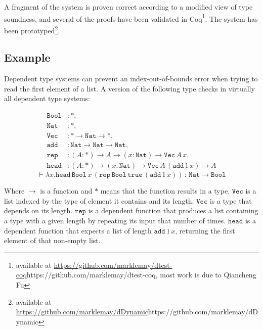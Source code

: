 A fragment of the system is proven correct according to a modified view of type soundness, and several of the proofs have been validated in Coq\footnote{
available at \url{https://github.com/marklemay/dtest-coq}{https://github.com/marklemay/dtest-coq}, most work is due to Qiancheng Fu}.
The system has been prototyped\footnote{available at \url{https://github.com/marklemay/dDynamic}{https://github.com/marklemay/dDynamic}}.


\subsection{Example}

Dependent type systems can prevent an index-out-of-bounds error when trying to read the first element of a list.
A version of the following type checks in virtually all dependent type systems:


\begin{align*}
\mathtt{Bool} & :*,\\
\mathtt{Nat} & :*,\\
\mathtt{Vec} & :*\rightarrow\mathtt{Nat}\rightarrow*,\\
\mathtt{add} & :\mathtt{Nat}\rightarrow\mathtt{Nat}\rightarrow\mathtt{Nat},\\
\mathtt{rep} & :\left(A:*\right)\rightarrow A\rightarrow\left(x:\mathtt{Nat}\right)\rightarrow\mathtt{Vec\,}A\,x,\\
\mathtt{head} & :\left(A:*\right)\rightarrow\left(x:\mathtt{Nat}\right)\rightarrow\mathtt{Vec}\,A\,\left(\mathtt{add}\,1\,x\right)\rightarrow A
\end{align*}
\[
\vdash\lambda x.\mathtt{head}\,\mathtt{Bool}\,x\,\left(\mathtt{rep}\,\mathtt{Bool}\,\mathtt{true}\,\left(\mathtt{add}\,1\,x\right)\right)\,:\,\mathtt{Nat}\rightarrow\mathtt{Bool}
\]


Where $\rightarrow$ is a function and $*$ means that the function results in a type.
$\mathtt{Vec}$ is a list indexed by the type of element it contains and its length.
$\mathtt{Vec}$ is a type that depends on its length.
$\mathtt{rep}$ is a dependent function that produces a list containing a type with a given length by repeating its input that number of times.
$\mathtt{head}$ is a dependent function that expects a list of length $\mathtt{add}\,1\,x$, returning the first element of that non-empty list.

